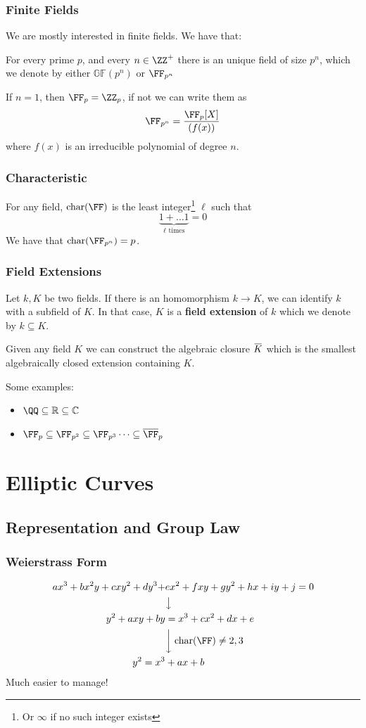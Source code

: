 \documentclass{beamer}
\newcommand{\overbar}[1]{\mkern 1.5mu\overline{\mkern-1.5mu#1\mkern-1.5mu}\mkern 1.5mu}
\begin{document}
\begin{frame}
    \frametitle{Finite Fields}
    We are mostly interested in finite fields. We have that:
    \begin{theorem}
        For every prime $p$, and every $n \in \ZZ^+$ there is an unique field of size $p^n$, which we denote 
        by either $\mathbb{GF}(p^n)$ or $\FF_{p^n}$
    \end{theorem}

    If $n = 1$, then $\FF_{p} = \ZZ_p$, if not we can write them as
    \[ \FF_{p^n} = \frac{\FF_{p}[X]}{(f(x))} \]
    where $f(x)$ is an irreducible polynomial of degree $n$.
\end{frame}

\begin{frame}
    \frametitle{Characteristic}
    For any field, $\mathrm{char}(\FF)$ is the least integer\footnote{Or $\infty$ if no such integer exists} $\ell$ such that 
    \[ \underbrace{1 + \dots 1}_{\ell \text{ times}} = 0 \]
    We have that $\mathrm{char}(\FF_{p^n}) = p$. 
\end{frame}

\begin{frame}
    \frametitle{Field Extensions}
    Let $k, K$ be two fields. If there is an homomorphism $k \to K$, we can identify $k$ with a subfield of $K$. 
    In that case, $K$ is a \textbf{field extension} of $k$ which we denote by $k \subseteq K$. 

    Given any field $K$ we can construct the algebraic closure $\overbar{K}$ which is the smallest algebraically closed extension containing $K$.

    Some examples:
    \begin{itemize}
        \item $\QQ \subseteq \mathbb{R} \subseteq \mathbb{C}$
        \item $\FF_p \subseteq \FF_{p^2} \subseteq \FF_{p^3} \dots \subseteq \overline{\FF}_{p}$
    \end{itemize}
\end{frame}

\section{Elliptic Curves}
\subsection{Representation and Group Law}
\begin{frame}
    \frametitle{Weierstrass Form} 
    \begin{align*}
        a x^3 + b x^2 y + c x y^2 + d y^3 +& e x^2 + f x y + g y^2 + h x + i y + j = 0 \\
        &\big\downarrow \\
        y^2 + a xy + b y &= x^3 + c x^2 + d x + e \\
        &\bigg\downarrow \; \mathrm{char}(\FF) \neq 2, 3 \\
        y^2 = x^3 &+ a x + b
    \end{align*}
    Much easier to manage!
\end{frame}
\end{document}
